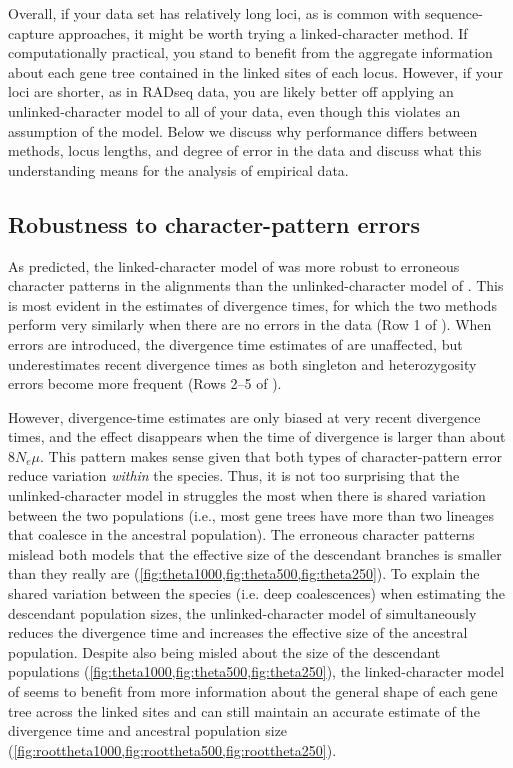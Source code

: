 Overall, if your data set has relatively long loci, as is common with
sequence-capture approaches, it might be worth trying a linked-character
method.
If computationally practical, you stand to benefit from the aggregate
information about each gene tree contained in the linked sites of each locus.
However, if your loci are shorter, as in RADseq data, you are likely better off
applying an unlinked-character model to all of your data, even though this
violates an assumption of the model.
Below we discuss why performance differs between methods, locus lengths, and
degree of error in the data and discuss what this understanding means for the
analysis of empirical data. 

\subsection{Robustness to character-pattern errors}
As predicted, the linked-character model of \beast was more robust to erroneous
character patterns in the alignments than the unlinked-character model of
\ecoevolity.
This is most evident in the estimates of divergence times, for which
the two methods perform very similarly when there are no errors in the
data (Row 1 of \timefigs).
When errors are introduced, the divergence time estimates of \beast are
unaffected, but \ecoevolity underestimates recent divergence times as both
singleton and heterozygosity errors become more frequent (Rows 2--5 of
\timefigs).

However, \ecoevolity divergence-time estimates are only biased at
very recent divergence times, and the effect disappears
when the time of divergence is larger than about $8N_e\mu$.
This pattern makes sense given that both types of character-pattern error
reduce variation \emph{within} the species.
Thus, it is not too surprising that the unlinked-character model in \ecoevolity
struggles the most when there is shared variation between
the two populations (i.e., most gene trees have more than
two lineages that coalesce in the ancestral population).
The erroneous character patterns mislead both models that the effective size of
the descendant branches is smaller than they really are
(\cref{fig:theta1000,fig:theta500,fig:theta250}).
To explain the shared variation between the species (i.e. deep coalescences)
when estimating the descendant population sizes,
the unlinked-character model of \ecoevolity
simultaneously reduces the divergence time and increases the effective
size of the ancestral population.
Despite also being misled about the size of the descendant populations
(\cref{fig:theta1000,fig:theta500,fig:theta250}),
the linked-character model of \beast seems to benefit from more information
about the general shape of each gene tree across the linked sites and can still
maintain an accurate estimate of the divergence time
\timefigsp
and ancestral population size
(\cref{fig:roottheta1000,fig:roottheta500,fig:roottheta250}).

